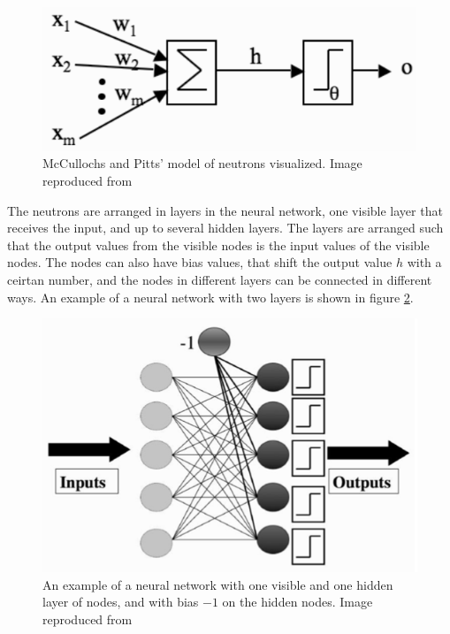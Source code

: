 \documentclass[norsk,a4paper,12pt]{article}
\begin{document}
 \begin{figure} [H]
 	\centering
 	\includegraphics[scale=0.6]{plots/neuron.png}
 	\caption{McCullochs and Pitts' model of neutrons visualized. Image reproduced from \cite{Marsland} }
 	\label{fig:neuron}
 \end{figure}

The neutrons are arranged in layers in the neural network, one visible layer that receives the input, and up to several hidden layers. The layers are arranged such that the output values from the visible nodes is the input values of the visible nodes. The nodes can also have bias values, that shift the output value $h$ with a ceirtan number, and the nodes in different layers can be connected in different ways.  An example of a neural network with two layers is shown in figure \ref{fig:neural_network}.

 \begin{figure} [H]
	\centering
	\includegraphics[scale=0.5]{plots/neural_network.png}
	\caption{An example of a neural network with one visible and one hidden layer of nodes, and with bias $-1$ on the hidden nodes. Image reproduced from \cite{Marsland} }
	\label{fig:neural_network}
\end{figure}
\end{document}
